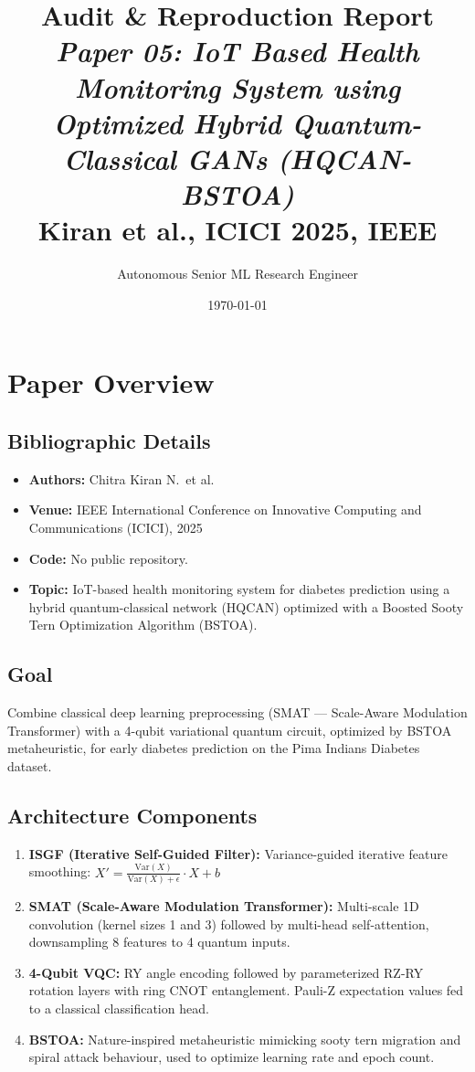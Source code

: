 \documentclass[12pt,a4paper]{article}
\title{\textbf{Audit \& Reproduction Report}\\[0.4em]
\large\textit{Paper 05: IoT Based Health Monitoring System using Optimized Hybrid Quantum-Classical GANs (HQCAN-BSTOA)}\\[0.3em]
Kiran et al., ICICI 2025, IEEE}
\author{Autonomous Senior ML Research Engineer}
\date{\today}
\begin{document}
\maketitle
\tableofcontents
\newpage

\section{Paper Overview}
\subsection{Bibliographic Details}
\begin{itemize}[leftmargin=*]
  \item \textbf{Authors:} Chitra Kiran N.\ et al.
  \item \textbf{Venue:} IEEE International Conference on Innovative Computing and Communications (ICICI), 2025
  \item \textbf{Code:} No public repository.
  \item \textbf{Topic:} IoT-based health monitoring system for diabetes prediction using a hybrid quantum-classical network (HQCAN) optimized with a Boosted Sooty Tern Optimization Algorithm (BSTOA).
\end{itemize}

\subsection{Goal}
Combine classical deep learning preprocessing (SMAT --- Scale-Aware Modulation Transformer) with a 4-qubit variational quantum circuit, optimized by BSTOA metaheuristic, for early diabetes prediction on the Pima Indians Diabetes dataset.

\subsection{Architecture Components}
\begin{enumerate}[leftmargin=*]
  \item \textbf{ISGF (Iterative Self-Guided Filter):} Variance-guided iterative feature smoothing:
    $X' = \frac{\text{Var}(X)}{\text{Var}(X) + \epsilon} \cdot X + b$
  \item \textbf{SMAT (Scale-Aware Modulation Transformer):} Multi-scale 1D convolution (kernel sizes 1 and 3) followed by multi-head self-attention, downsampling 8 features to 4 quantum inputs.
  \item \textbf{4-Qubit VQC:} RY angle encoding followed by parameterized RZ-RY rotation layers with ring CNOT entanglement. Pauli-Z expectation values fed to a classical classification head.
  \item \textbf{BSTOA:} Nature-inspired metaheuristic mimicking sooty tern migration and spiral attack behaviour, used to optimize learning rate and epoch count.
\end{enumerate}
\end{document}
